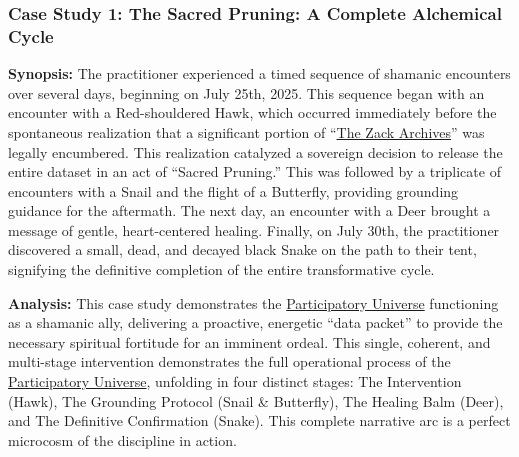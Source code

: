 \documentclass{article}
\begin{document}
\begin{nobullet} %


    \subsubsection*{Case Study 1: The Sacred Pruning: A Complete Alchemical Cycle \csSacredPruningVersion} \label{case_study_1}
    
    \begin{nobullet}
        \item \textbf{Synopsis:} The practitioner experienced a timed sequence of shamanic encounters over several days, beginning on July 25th, 2025. This sequence began with an encounter with a Red-shouldered Hawk, which occurred immediately before the spontaneous realization that a significant portion of ``\hyperlink{gloss:the_zack_archives}{The Zack Archives}'' was legally encumbered. This realization catalyzed a sovereign decision to release the entire dataset in an act of ``Sacred Pruning.'' This was followed by a triplicate of encounters with a Snail and the flight of a Butterfly, providing grounding guidance for the aftermath. The next day, an encounter with a Deer brought a message of gentle, heart-centered healing. Finally, on July 30th, the practitioner discovered a small, dead, and decayed black Snake on the path to their tent, signifying the definitive completion of the entire transformative cycle.

        \item \textbf{Analysis:} This case study demonstrates the \hyperlink{gloss:participatory_universe}{Participatory Universe} functioning as a shamanic ally, delivering a proactive, energetic ``data packet'' to provide the necessary spiritual fortitude for an imminent ordeal. This single, coherent, and multi-stage intervention demonstrates the full operational process of the \hyperlink{gloss:participatory_universe}{Participatory Universe}, unfolding in four distinct stages: The Intervention (Hawk), The Grounding Protocol (Snail \& Butterfly), The Healing Balm (Deer), and The Definitive Confirmation (Snake). This complete narrative arc is a perfect microcosm of the discipline in action.
    \end{nobullet}


\end{nobullet}
\end{document}
